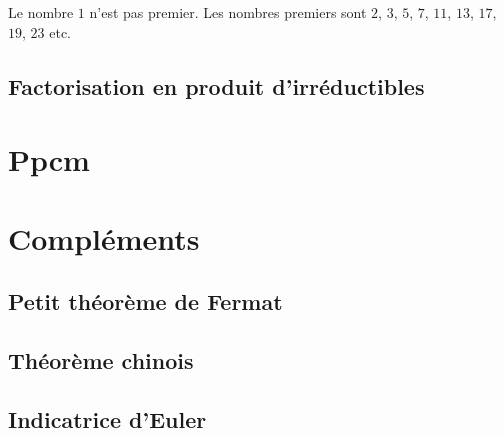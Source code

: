  Le nombre $1$ n'est pas premier. Les nombres premiers sont $2$, $3$, $5$, $7$, $11$, $13$, $17$, $19$, $23$ etc.




\subsection{Factorisation en produit d'irréductibles}

\section{Ppcm}

\section{Compléments}

\subsection{Petit théorème de Fermat}
\subsection{Théorème chinois}
\subsection{Indicatrice d'Euler}
